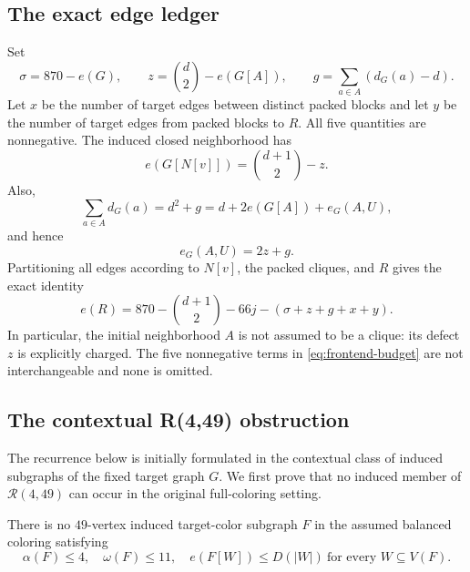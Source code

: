 \subsection{The exact edge ledger}

Set
\[
\sigma=870-e(G),\qquad
z=\binom d2-e(G[A]),\qquad
g=\sum_{a\in A}(d_G(a)-d).
\]
Let $x$ be the number of target edges between distinct packed blocks and let $y$ be the number of target edges from packed blocks to $R$. All five quantities are nonnegative. The induced closed neighborhood has
\[
e(G[N[v]])=\binom{d+1}{2}-z.
\]
Also,
\[
\sum_{a\in A}d_G(a)=d^2+g
=d+2e(G[A])+e_G(A,U),
\]
and hence
\[
e_G(A,U)=2z+g.
\]
Partitioning all edges according to $N[v]$, the packed cliques, and $R$ gives the exact identity
\begin{equation}
e(R)=870-\binom{d+1}{2}-66j-(\sigma+z+g+x+y).
\label{eq:frontend-budget}
\end{equation}
In particular, the initial neighborhood $A$ is not assumed to be a clique: its defect $z$ is explicitly charged. The five nonnegative terms in \eqref{eq:frontend-budget} are not interchangeable and none is omitted.

\subsection{The contextual R(4,49) obstruction}

The recurrence below is initially formulated in the contextual class of induced subgraphs of the fixed target graph $G$. We first prove that no induced member of $\mathcal R(4,49)$ can occur in the original full-coloring setting.

\begin{lemma}
\label{lem:context49}
There is no $49$-vertex induced target-color subgraph $F$ in the assumed balanced coloring satisfying
\[
\alpha(F)\leq4,\quad \omega(F)\leq11,\quad
e(F[W])\leq D(|W|)\ \text{for every }W\subseteq V(F).
\]
\end{lemma}

